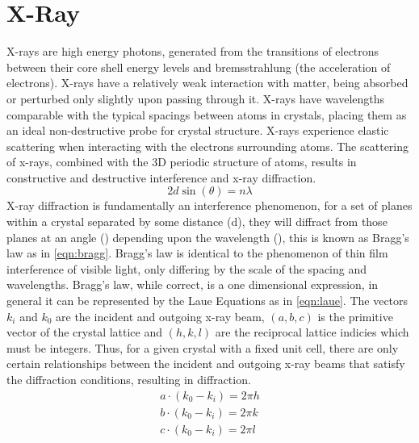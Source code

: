 \section{X-Ray}
X-rays are high energy photons, generated from the transitions of electrons between their core shell energy levels and bremsstrahlung (the acceleration of electrons). X-rays have a relatively weak interaction with matter, being absorbed or perturbed only slightly upon passing through it. X-rays have wavelengths comparable with the typical spacings between atoms in crystals, placing them as an ideal non-destructive probe for crystal structure. X-rays experience elastic scattering when interacting with the electrons surrounding atoms. The scattering of x-rays, combined with the 3D periodic structure of atoms, results in constructive and destructive interference and x-ray diffraction.
\begin{equation}
\label{eqn:bragg} 2d \sin(\theta) = n \lambda
\end{equation}
X-ray diffraction is fundamentally an interference phenomenon, for a set of planes within a crystal separated by some distance (d), they will diffract from those planes at an angle (\texttheta) depending upon the wavelength (\textlambda), this is known as Bragg's law as in \cref{eqn:bragg}. Bragg's law is identical to the phenomenon of thin film interference of visible light, only differing by the scale of the spacing and wavelengths. Bragg's law, while correct, is a one dimensional expression, in general it can be represented by the Laue Equations as in \cref{eqn:laue}. The vectors $k_i$ and $k_0$ are the incident and outgoing x-ray beam, $(a,b,c)$ is the primitive vector of the crystal lattice and $(h,k,l)$ are the reciprocal lattice indicies which must be integers. Thus, for a given crystal with a fixed unit cell, there are only certain relationships between the incident and outgoing x-ray beams that satisfy the diffraction conditions, resulting in diffraction.
\begin{align}
   a \cdot (k_0 - k_i) = 2 \pi h \\
   b \cdot (k_0 - k_i) = 2 \pi k \\
   c \cdot (k_0 - k_i) = 2 \pi l
   \label{eqn:laue}
\end{align}

